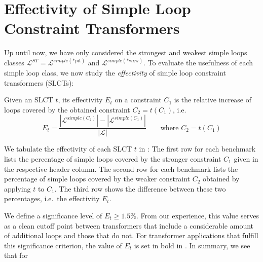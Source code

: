 \section{Effectivity of Simple Loop Constraint Transformers}
\label{sec:eff_transformers}
Up until now, we have only considered the strongest and weakest simple loops classes $\mathcal{L}^{ST} = \mathcal{L}^{simple(\text{*pit})}$ and $\mathcal{L}^{simple(\text{*wxw})}$. To evaluate the usefulness of each simple loop class, we now study the \emph{effectivity} of simple loop constraint transformers (SLCTs):

\begin{definition}
    Given an SLCT $t$, its effectivity $E_t$ on a constraint $C_1$ is the relative increase of loops covered by the obtained constraint $C_2 = t(C_1)$, i.e.\
    \[ E_t = \frac{ | \mathcal{L}^{simple(C_2)} | - | \mathcal{L}^{simple(C_1)} | }{ | \mathcal{L} | } \qquad \textrm{where } C_2 = t(C_1) \]
\end{definition}

We tabulate the effectivity of each SLCT $t$ in : The first row for each benchmark lists the percentage of simple loops covered by the stronger constraint $C_1$ given in the respective header column. The second row for each benchmark lists the percentage of simple loops covered by the weaker constraint $C_2$ obtained by applying $t$ to $C_1$. The third row shows the difference between these two percentages, i.e.\ the effectivity $E_t$.

We define a significance level of $E_t \ge 1.5\%$. From our experience, this value serves as a clean cutoff point between transformers that include a considerable amount of additional loops and those that do not. For transformer applications that fulfill this significance criterion, the value of $E_t$ is set in bold in . In summary, we see that for

